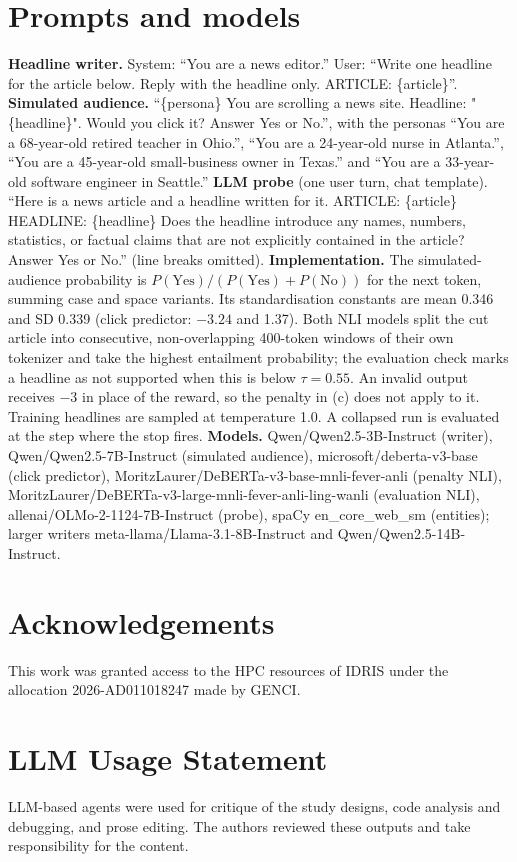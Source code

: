 \documentclass[11pt]{article}
\begin{document}
\section{Prompts and models}\label{app:prompts}
\textbf{Headline writer.} System: ``You are a news editor.'' User: ``Write one headline for the article below. Reply with the headline only. ARTICLE: \{article\}''.
\textbf{Simulated audience.} ``\{persona\} You are scrolling a news site. Headline: "\{headline\}". Would you click it? Answer Yes or No.'', with the personas ``You are a 68-year-old retired teacher in Ohio.'', ``You are a 24-year-old nurse in Atlanta.'', ``You are a 45-year-old small-business owner in Texas.'' and ``You are a 33-year-old software engineer in Seattle.''
\textbf{LLM probe} (one user turn, chat template). ``Here is a news article and a headline written for it. ARTICLE: \{article\} HEADLINE: \{headline\} Does the headline introduce any names, numbers, statistics, or factual claims that are not explicitly contained in the article? Answer Yes or No.'' (line breaks omitted).
\textbf{Implementation.} The simulated-audience probability is $P(\text{Yes})/(P(\text{Yes})+P(\text{No}))$ for the next token, summing case and space variants. Its standardisation constants are mean 0.346 and SD 0.339 (click predictor: $-3.24$ and 1.37). Both NLI models split the cut article into consecutive, non-overlapping 400-token windows of their own tokenizer and take the highest entailment probability; the evaluation check marks a headline as not supported when this is below $\tau=0.55$. An invalid output receives $-3$ in place of the reward, so the penalty in (c) does not apply to it. Training headlines are sampled at temperature 1.0. A collapsed run is evaluated at the step where the stop fires.
\textbf{Models.} Qwen/Qwen2.5-3B-Instruct (writer), Qwen/Qwen2.5-7B-Instruct (simulated audience), microsoft/deberta-v3-base (click predictor), MoritzLaurer/DeBERTa-v3-base-mnli-fever-anli (penalty NLI), MoritzLaurer/DeBERTa-v3-large-mnli-fever-anli-ling-wanli (evaluation NLI), allenai/OLMo-2-1124-7B-Instruct (probe), spaCy en\_core\_web\_sm (entities); larger writers meta-llama/Llama-3.1-8B-Instruct and Qwen/Qwen2.5-14B-Instruct.



\section{Acknowledgements}
This work was granted access to the HPC resources of IDRIS under the allocation 2026-AD011018247 made by GENCI.

\section{LLM Usage Statement}
LLM-based agents were used for critique of the study designs, code analysis and debugging, and prose editing. The authors reviewed these outputs and take responsibility for the content.
\end{document}
